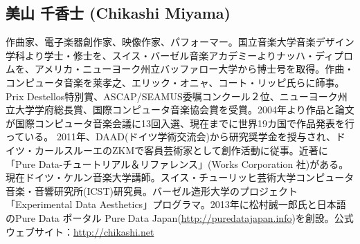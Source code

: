 \documentclass{jsarticle}
\begin{document}
\subsection{美山 千香士 (Chikashi Miyama)}
作曲家、電子楽器創作家、映像作家、パフォーマー。国立音楽大学音楽デザイン学科より学士・修士を、スイス・バーゼル音楽アカデミーよりナッハ・ディプロムを、アメリカ・ニューヨーク州立バッファロー大学から博士号を取得。作曲・コンピュータ音楽を莱孝之、エリック・オニャ、コート・リッピ氏らに師事。Prix Destellos特別賞、ASCAP/SEAMUS委嘱コンクール２位、ニューヨーク州立大学学府総長賞、国際コンピュータ音楽協会賞を受賞。2004年より作品と論文が国際コンピュータ音楽会議に13回入選、現在までに世界19カ国で作品発表を行っている。 2011年、DAAD(ドイツ学術交流会)から研究奨学金を授与され、ドイツ・カールスルーエのZKMで客員芸術家として創作活動に従事。近著に「Pure Data-チュートリアル＆リファレンス」(Works Corporation 社)がある。現在ドイツ・ケルン音楽大学講師。スイス・チューリッヒ芸術大学コンピュータ音楽・音響研究所(ICST)研究員。バーゼル造形大学のプロジェクト「Experimental Data Aesthetics」プログラマ。2013年に松村誠一郎氏と日本語のPure Data ポータル Pure Data Japan(\url{http://puredatajapan.info})を創設。公式ウェブサイト：\url{http://chikashi.net}
\end{document}
